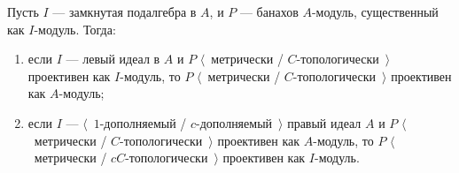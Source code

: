 \begin{proposition}\label{MetTopProjUnderChangeOfAlg} Пусть $I$ --- замкнутая
подалгебра в $A$, и $P$ --- банахов $A$-модуль, существенный как $I$-модуль.
Тогда:
\begin{enumerate}[label = (\roman*)]
    \item если $I$ --- левый идеал в $A$ и $P$ $\langle$~метрически /
    $C$-топологически~$\rangle$ проективен как $I$-модуль, то $P$
    $\langle$~метрически / $C$-топологически~$\rangle$ проективен как
    $A$-модуль;

    \item если $I$ --- $\langle$~$1$-дополняемый / $c$-дополняемый~$\rangle$
    правый идеал $A$ и $P$ $\langle$~метрически / $C$-топологически~$\rangle$
    проективен как $A$-модуль, то $P$ $\langle$~метрически /
    $cC$-топологически~$\rangle$ проективен как $I$-модуль.
\end{enumerate}
\end{proposition}
